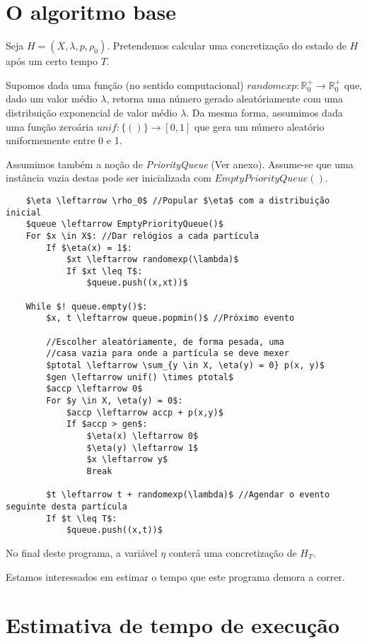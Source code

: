 \documentclass{article}
\newcommand{\R}{\mathbb{R}}
\begin{document}
	\section{O algoritmo base}
	
	Seja $H = (X, \lambda, p, \rho_0)$. Pretendemos calcular uma concretização do estado de $H$ após um certo tempo $T$.
	
	Supomos dada uma função (no sentido computacional) ${randomexp : \R^+_0 \rightarrow \R^+_0}$ que, dado um valor médio $\lambda$, retorna uma número gerado aleatóriamente com uma distribuição exponencial de valor médio $\lambda$. Da mesma forma, assumimos dada uma função zeroária $unif : \{()\} \rightarrow [0,1]$ que gera um número aleatório uniformemente entre 0 e 1.
	
	Assumimos também a noção de \emph{PriorityQueue} (Ver anexo). Assume-se que uma instância vazia destas pode ser inicializada com $EmptyPriorityQueue()$.
	
	\begin{minipage}{\linewidth}
	\begin{lstlisting}
	$\eta \leftarrow \rho_0$ //Popular $\eta$ com a distribuição inicial
	$queue \leftarrow EmptyPriorityQueue()$
	For $x \in X$: //Dar relógios a cada partícula
		If $\eta(x) = 1$:
			$xt \leftarrow randomexp(\lambda)$
			If $xt \leq T$:
				$queue.push((x,xt))$

	While $! queue.empty()$:
		$x, t \leftarrow queue.popmin()$ //Próximo evento
		
		//Escolher aleatóriamente, de forma pesada, uma
		//casa vazia para onde a partícula se deve mexer
		$ptotal \leftarrow \sum_{y \in X, \eta(y) = 0} p(x, y)$
		$gen \leftarrow unif() \times ptotal$
		$accp \leftarrow 0$
		For $y \in X, \eta(y) = 0$:
			$accp \leftarrow accp + p(x,y)$
			If $accp > gen$:
				$\eta(x) \leftarrow 0$
				$\eta(y) \leftarrow 1$
				$x \leftarrow y$
				Break
		
		$t \leftarrow t + randomexp(\lambda)$ //Agendar o evento seguinte desta partícula
		If $t \leq T$:
			$queue.push((x,t))$
	\end{lstlisting}
	\end{minipage}
	
	\bigskip
	
	No final deste programa, a variável $\eta$ conterá uma concretização de $H_T$.
	
	Estamos interessados em estimar o tempo que este programa demora a correr.
	
	\section{Estimativa de tempo de execução}
	
\end{document}
